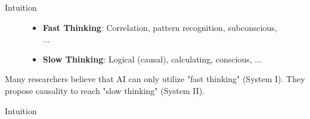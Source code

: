 \begin{frame}{Intuition}
\begin{figure}
\begin{minipage}[t]{0.30\linewidth}
        \end{minipage}
        \hspace{0.5cm}
        \begin{minipage}[t]{0.5\linewidth}
            \vspace{1cm}
            \begin{itemize}
                \item \textbf{Fast Thinking}: Correlation, pattern recognition, subconscious, ...
                \item \textbf{Slow Thinking}: Logical (causal), calculating, conscious, ...
            \end{itemize}
        \end{minipage}
    \end{figure}
    Many researchers believe that AI can only utilize "fast thinking" (System I). They propose causality to reach "slow thinking" (System II).
\end{frame}
\begin{frame}{Intuition}
\end{frame}
    